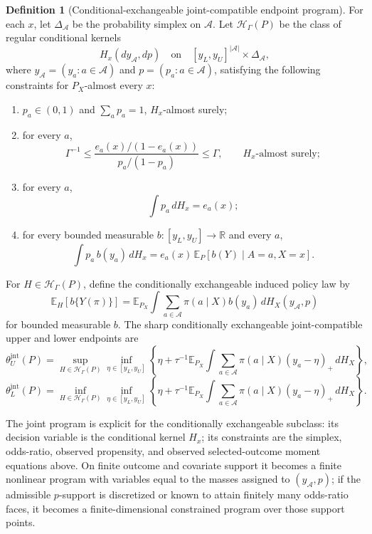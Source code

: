 \documentclass[11pt]{article}
\newcommand{\E}{\mathbb{E}}
\newcommand{\calH}{\mathcal{H}}
\newcommand{\R}{\mathbb{R}}
\theoremstyle{definition}
\newtheorem{definition}{Definition}
\theoremstyle{plain}
\theoremstyle{remark}
\begin{document}
\begin{definition}[Conditional-exchangeable joint-compatible endpoint program]\label{def:joint-kernels}
For each \(x\), let \(\Delta_{\mathcal A}\) be the probability simplex on
\(\mathcal A\).  Let \(\calH_\Gamma(P)\) be the class of regular conditional
kernels
\[
H_x(dy_{\mathcal A},dp)
\quad\text{on}\quad
[y_L,y_U]^{|\mathcal A|}\times \Delta_{\mathcal A},
\]
where \(y_{\mathcal A}=(y_a:a\in\mathcal A)\) and
\(p=(p_a:a\in\mathcal A)\), satisfying the following constraints for
\(P_X\)-almost every \(x\):
\begin{enumerate}[label=(\roman*),leftmargin=2em]
\item \(p_a\in(0,1)\) and \(\sum_a p_a=1\), \(H_x\)-almost surely;
\item for every \(a\),
\[
\Gamma^{-1}\leq
\frac{e_a(x)/(1-e_a(x))}{p_a/(1-p_a)}
\leq \Gamma,
\qquad H_x\text{-almost surely};
\]
\item for every \(a\),
\[
\int p_a\,dH_x=e_a(x);
\]
\item for every bounded measurable \(b:[y_L,y_U]\to\R\) and every \(a\),
\[
\int p_a\,b(y_a)\,dH_x
=
e_a(x)\,\E_P[b(Y)\mid A=a,X=x].
\]
\end{enumerate}
For \(H\in\calH_\Gamma(P)\), define the conditionally exchangeable induced
policy law by
\[
\E_H[b\{Y(\pi)\}]
=
\E_{P_X}\int
\sum_{a\in\mathcal A}\pi(a\mid X)b(y_a)\,dH_X(y_{\mathcal A},p)
\]
for bounded measurable \(b\).  The sharp conditionally exchangeable
joint-compatible upper and lower endpoints are
\[
\theta_U^{\mathrm{jnt}}(P)
=
\sup_{H\in\calH_\Gamma(P)}
\inf_{\eta\in[y_L,y_U]}
\left\{
\eta+\tau^{-1}
\E_{P_X}\int
\sum_{a\in\mathcal A}\pi(a\mid X)(y_a-\eta)_+\,dH_X
\right\},
\]
\[
\theta_L^{\mathrm{jnt}}(P)
=
\inf_{H\in\calH_\Gamma(P)}
\inf_{\eta\in[y_L,y_U]}
\left\{
\eta+\tau^{-1}
\E_{P_X}\int
\sum_{a\in\mathcal A}\pi(a\mid X)(y_a-\eta)_+\,dH_X
\right\}.
\]
\end{definition}

The joint program is explicit for the conditionally exchangeable subclass: its
decision variable is the conditional kernel \(H_x\); its constraints are the
simplex, odds-ratio, observed propensity, and observed selected-outcome moment
equations above.  On finite outcome and covariate support it becomes a finite
nonlinear program with variables equal to the masses assigned to
\((y_{\mathcal A},p)\); if the admissible \(p\)-support is discretized or known
to attain finitely many odds-ratio faces, it becomes a finite-dimensional
constrained program over those support points.
\end{document}
